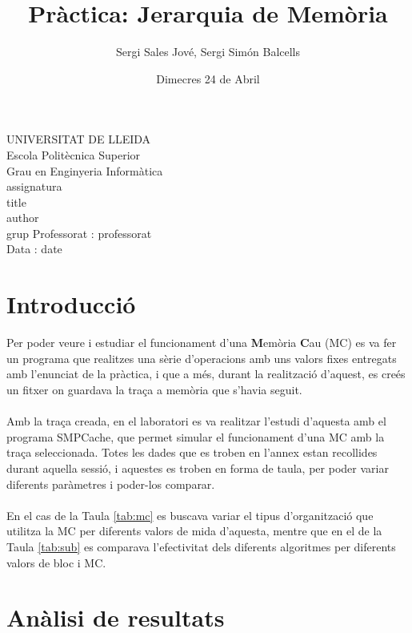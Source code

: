 \documentclass{article}
\title{Pràctica: Jerarquia de Memòria}
\author{Sergi Sales Jové, Sergi Simón Balcells}
\date{Dimecres 24 de Abril}
\renewcommand{\maketitle}{ %
    \begin{titlepage}
        \raggedright{UNIVERSITAT DE LLEIDA \\
            Escola Politècnica Superior \\
            Grau en Enginyeria Informàtica\\
            \1assignatura\\}
            \vspace{5cm}
            \centering\huge{\5title \\}
            \vspace{3cm}
            \large{\6author} \\
            \normalsize{\3grup}
            \vfill
            Professorat : \4professorat \\
            Data : \7date
\end{titlepage}}
\begin{document}
\maketitle
\thispagestyle{empty}

\newpage
{}
\tableofcontents
\listoftables
\newpage
{}
\section{Introducció}
Per poder veure i estudiar el funcionament d'una \textbf{M}emòria \textbf{C}au (MC) es va fer un
programa que realitzes una sèrie d'operacions amb uns valors fixes entregats amb l'enunciat de
la pràctica, i que a més, durant la realització d'aquest, es creés un fitxer on guardava la traça a memòria
que s'havia seguit.\\\\
%
Amb la traça creada, en el laboratori es va realitzar l'estudi d'aquesta amb el
programa SMPCache, que permet simular
el funcionament d'una MC amb la traça seleccionada. Totes les dades que es troben en
l'annex estan recollides durant aquella sessió,
i aquestes es troben en forma de taula, per poder variar diferents paràmetres
i poder-los comparar.\\\\
%
En el cas de la Taula \ref{tab:mc} es buscava variar el tipus d'organització que utilitza la MC
per diferents valors de mida d'aquesta, mentre que en el de la Taula \ref{tab:sub}
es comparava l'efectivitat dels diferents algoritmes per diferents valors de bloc i MC.
\section{Anàlisi de resultats}
\end{document}
